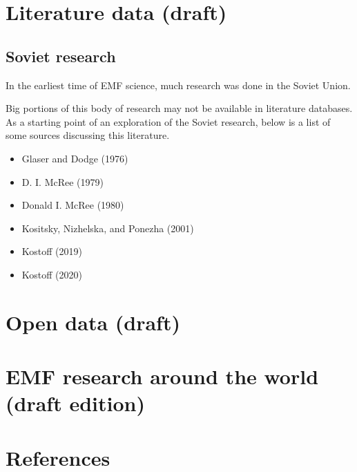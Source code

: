 \documentclass[
  letterpaper,
  DIV=11,
  numbers=noendperiod]{scrreprt}
\providecommand{\tightlist}{%
  \setlength{\itemsep}{0pt}\setlength{\parskip}{0pt}}\usepackage{longtable,booktabs,array}
\begin{document}
\hypertarget{literature-data-draft}{%
\chapter{Literature data (draft)}\label{literature-data-draft}}

\hypertarget{soviet-research}{%
\section{Soviet research}\label{soviet-research}}

In the earliest time of EMF science, much research was done in the
Soviet Union.

Big portions of this body of research may not be available in literature
databases. As a starting point of an exploration of the Soviet research,
below is a list of some sources discussing this literature.

\begin{itemize}
\tightlist
\item
  Glaser and Dodge (1976)
\item
  D. I. McRee (1979)
\item
  Donald I. McRee (1980)
\item
  Kositsky, Nizhelska, and Ponezha (2001)
\item
  Kostoff (2019)
\item
  Kostoff (2020)
\end{itemize}

\hypertarget{open-data-draft}{%
\chapter{Open data (draft)}\label{open-data-draft}}

\hypertarget{emf-research-around-the-world-draft-edition}{%
\chapter{EMF research around the world (draft
edition)}\label{emf-research-around-the-world-draft-edition}}


\hypertarget{references}{%
\chapter*{References}\label{references}}

\end{document}
